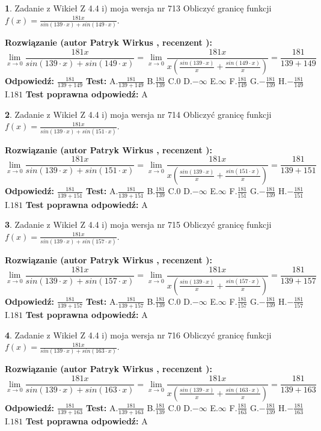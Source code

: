 \documentclass[12pt, a4paper]{article}
\theoremstyle{definition} %
\newtheorem{zad}{}
\newcommand{\zadStart}[1]{\begin{zad}#1\newline}
\newcommand{\zadStop}{\end{zad}}
\newcommand{\rozwStart}[2]{\noindent \textbf{Rozwiązanie (autor #1 , recenzent #2): }\newline}
\newcommand{\rozwStop}{\newline}
\newcommand{\odpStart}{\noindent \textbf{Odpowiedź:}\newline}
\newcommand{\odpStop}{\newline}
\newcommand{\testStart}{\noindent \textbf{Test:}\newline}
\newcommand{\testStop}{\newline}
\newcommand{\kluczStart}{\noindent \textbf{Test poprawna odpowiedź:}\newline}
\newcommand{\kluczStop}{\newline}
\begin{document}
\zadStart{Zadanie z Wikieł Z 4.4 i) moja wersja nr 713}
Obliczyć granicę funkcji $f(x)=\frac{181x}{sin(139\cdot x) +sin(149\cdot x)}$.
\zadStop
\rozwStart{Patryk Wirkus}{}
$$\lim\limits_{x\to 0}\frac{181x}{sin(139\cdot x) +sin(149\cdot x)}=\lim\limits_{x\to 0}\frac{181x}{x(\frac{sin(139\cdot x)}{x}+\frac{sin(149\cdot x)}{x})}=\frac{181}{139+149}$$
\rozwStop
\odpStart
$\frac{181}{139+149}$
\odpStop
\testStart
A.$\frac{181}{139+149}$
B.$\frac{181}{139}$
C.$0$
D.$-\infty$
E.$\infty$
F.$\frac{181}{149}$
G.$-\frac{181}{139}$
H.$-\frac{181}{149}$
I.$181$
\testStop
\kluczStart
A
\kluczStop



\zadStart{Zadanie z Wikieł Z 4.4 i) moja wersja nr 714}
Obliczyć granicę funkcji $f(x)=\frac{181x}{sin(139\cdot x) +sin(151\cdot x)}$.
\zadStop
\rozwStart{Patryk Wirkus}{}
$$\lim\limits_{x\to 0}\frac{181x}{sin(139\cdot x) +sin(151\cdot x)}=\lim\limits_{x\to 0}\frac{181x}{x(\frac{sin(139\cdot x)}{x}+\frac{sin(151\cdot x)}{x})}=\frac{181}{139+151}$$
\rozwStop
\odpStart
$\frac{181}{139+151}$
\odpStop
\testStart
A.$\frac{181}{139+151}$
B.$\frac{181}{139}$
C.$0$
D.$-\infty$
E.$\infty$
F.$\frac{181}{151}$
G.$-\frac{181}{139}$
H.$-\frac{181}{151}$
I.$181$
\testStop
\kluczStart
A
\kluczStop



\zadStart{Zadanie z Wikieł Z 4.4 i) moja wersja nr 715}
Obliczyć granicę funkcji $f(x)=\frac{181x}{sin(139\cdot x) +sin(157\cdot x)}$.
\zadStop
\rozwStart{Patryk Wirkus}{}
$$\lim\limits_{x\to 0}\frac{181x}{sin(139\cdot x) +sin(157\cdot x)}=\lim\limits_{x\to 0}\frac{181x}{x(\frac{sin(139\cdot x)}{x}+\frac{sin(157\cdot x)}{x})}=\frac{181}{139+157}$$
\rozwStop
\odpStart
$\frac{181}{139+157}$
\odpStop
\testStart
A.$\frac{181}{139+157}$
B.$\frac{181}{139}$
C.$0$
D.$-\infty$
E.$\infty$
F.$\frac{181}{157}$
G.$-\frac{181}{139}$
H.$-\frac{181}{157}$
I.$181$
\testStop
\kluczStart
A
\kluczStop



\zadStart{Zadanie z Wikieł Z 4.4 i) moja wersja nr 716}
Obliczyć granicę funkcji $f(x)=\frac{181x}{sin(139\cdot x) +sin(163\cdot x)}$.
\zadStop
\rozwStart{Patryk Wirkus}{}
$$\lim\limits_{x\to 0}\frac{181x}{sin(139\cdot x) +sin(163\cdot x)}=\lim\limits_{x\to 0}\frac{181x}{x(\frac{sin(139\cdot x)}{x}+\frac{sin(163\cdot x)}{x})}=\frac{181}{139+163}$$
\rozwStop
\odpStart
$\frac{181}{139+163}$
\odpStop
\testStart
A.$\frac{181}{139+163}$
B.$\frac{181}{139}$
C.$0$
D.$-\infty$
E.$\infty$
F.$\frac{181}{163}$
G.$-\frac{181}{139}$
H.$-\frac{181}{163}$
I.$181$
\testStop
\kluczStart
A
\kluczStop
\end{document}
